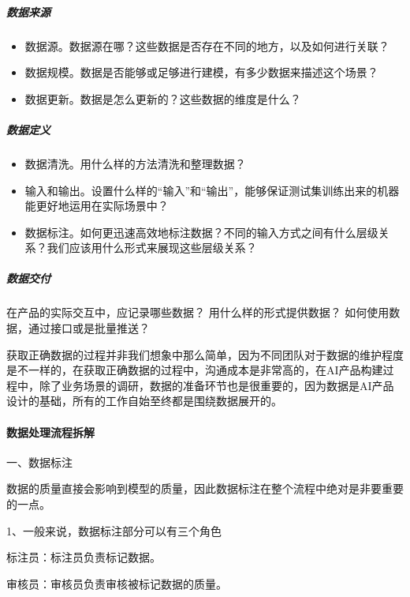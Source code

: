 \documentclass[letterpaper,11pt,english]{sphinxmanual}
\begin{document}
\subparagraph{数据来源}
\label{\detokenize{chapter_project/Data Process:id3}}\begin{itemize}
\item {} 
数据源。数据源在哪？这些数据是否存在不同的地方，以及如何进行关联？

\item {} 
数据规模。数据是否能够或足够进行建模，有多少数据来描述这个场景？

\item {} 
数据更新。数据是怎么更新的？这些数据的维度是什么？

\end{itemize}


\subparagraph{数据定义}
\label{\detokenize{chapter_project/Data Process:id4}}\begin{itemize}
\item {} 
数据清洗。用什么样的方法清洗和整理数据？

\item {} 
输入和输出。设置什么样的“输入”和“输出”，能够保证测试集训练出来的机器能更好地运用在实际场景中？

\item {} 
数据标注。如何更迅速高效地标注数据？不同的输入方式之间有什么层级关系？我们应该用什么形式来展现这些层级关系？

\end{itemize}


\subparagraph{数据交付}
\label{\detokenize{chapter_project/Data Process:id5}}\label{\detokenize{chapter_project/Data Process:id6}}
在产品的实际交互中，应记录哪些数据？ 用什么样的形式提供数据？
如何使用数据，通过接口或是批量推送？

获取正确数据的过程并非我们想象中那么简单，因为不同团队对于数据的维护程度是不一样的，在获取正确数据的过程中，沟通成本是非常高的，在AI产品构建过程中，除了业务场景的调研，数据的准备环节也是很重要的，因为数据是AI产品设计的基础，所有的工作自始至终都是围绕数据展开的。


\paragraph{数据处理流程拆解}
\label{\detokenize{chapter_project/Data Process:id7}}
一、数据标注

数据的质量直接会影响到模型的质量，因此数据标注在整个流程中绝对是非要重要的一点。

1、一般来说，数据标注部分可以有三个角色

标注员：标注员负责标记数据。

审核员：审核员负责审核被标记数据的质量。
\end{document}
